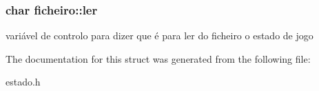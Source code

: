 \subsubsection[{\texorpdfstring{ler}{ler}}]{\setlength{\rightskip}{0pt plus 5cm}char ficheiro\+::ler}\hypertarget{structficheiro_a6103c88bea7da15963a15e45823cc309}{}\label{structficheiro_a6103c88bea7da15963a15e45823cc309}
variável de controlo para dizer que é para ler do ficheiro o estado de jogo 

The documentation for this struct was generated from the following file\+:\begin{DoxyCompactItemize}
\item 
estado.\+h\end{DoxyCompactItemize}
